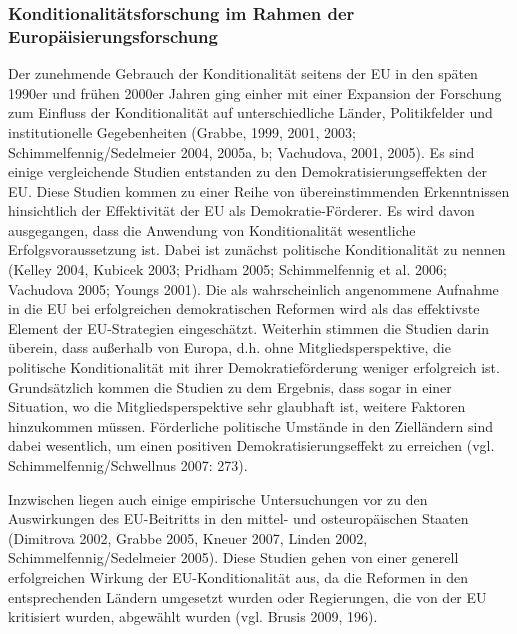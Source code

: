 \subsubsection{Konditionalitätsforschung im Rahmen der Europäisierungsforschung }
Der zunehmende Gebrauch der Konditionalität seitens der EU in den späten 1990er und frühen 2000er Jahren ging einher mit einer Expansion der Forschung zum Einfluss der Konditionalität auf unterschiedliche Länder, Politikfelder und institutionelle Gegebenheiten (Grabbe, 1999, 2001, 2003; Schimmelfennig/Sedelmeier 2004, 2005a, b; Vachudova, 2001, 2005). Es sind einige vergleichende Studien entstanden zu den Demokratisierungseffekten der EU. Diese Studien kommen zu einer Reihe von übereinstimmenden Erkenntnissen hinsichtlich der Effektivität der EU als Demokratie-Förderer. Es wird davon ausgegangen, dass die Anwendung von Konditionalität wesentliche Erfolgsvoraussetzung ist. Dabei ist zunächst politische Konditionalität zu nennen (Kelley 2004, Kubicek 2003; Pridham 2005; Schimmelfennig et al. 2006; Vachudova 2005; Youngs 2001). Die als wahrscheinlich angenommene Aufnahme in die EU bei erfolgreichen demokratischen Reformen wird als das effektivste Element der EU-Strategien eingeschätzt. Weiterhin stimmen die Studien darin überein, dass außerhalb von Europa, d.h. ohne Mitgliedsperspektive, die politische Konditionalität mit ihrer Demokratieförderung weniger erfolgreich ist. Grundsätzlich kommen die Studien zu dem Ergebnis, dass sogar in einer Situation, wo die Mitgliedsperspektive sehr glaubhaft ist, weitere Faktoren hinzukommen müssen. Förderliche politische Umstände in den Zielländern sind dabei wesentlich, um einen positiven Demokratisierungseffekt zu erreichen (vgl. Schimmelfennig/Schwellnus 2007: 273).\par
Inzwischen liegen auch einige empirische Untersuchungen vor zu den Auswirkungen des EU-Beitritts in den mittel- und osteuropäischen Staaten (Dimitrova 2002, Grabbe 2005, Kneuer 2007, Linden 2002, Schimmelfennig/Sedelmeier 2005). Diese Studien gehen von einer generell erfolgreichen Wirkung der EU-Konditionalität aus, da die Reformen in den entsprechenden Ländern umgesetzt wurden oder Regierungen, die von der EU kritisiert wurden, abgewählt wurden (vgl. Brusis 2009, 196).\par

